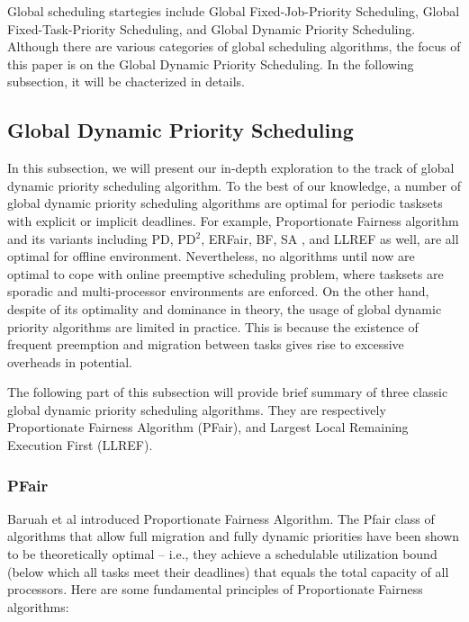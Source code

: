 \documentclass[preprint,12pt]{elsarticle}
\begin{document}
Global scheduling startegies include Global Fixed-Job-Priority Scheduling,
Global Fixed-Task-Priority Scheduling, and Global Dynamic Priority Scheduling. 
Although there are various categories of global scheduling algorithms, the
focus of this paper is on the Global Dynamic Priority Scheduling. In the
following subsection, it will be chacterized in details. 

\subsection{Global Dynamic Priority Scheduling}
In this subsection, we will present our in-depth exploration to the track of
global dynamic priority scheduling algorithm. To the best of our knowledge, a
number of global dynamic priority scheduling algorithms are optimal for
periodic tasksets with explicit or implicit deadlines.
For example, Proportionate Fairness algorithm and its variants including PD,
PD$^2$, ERFair, BF, SA \cite{khemka1997optimal}, and LLREF
\cite{cho2006optimal} as well, are all optimal for offline environment.
Nevertheless, no algorithms until now are optimal to cope with online
preemptive scheduling problem, where tasksets are sporadic and multi-processor
environments are enforced.
On the other hand, despite of its optimality and dominance in theory, the
usage of global dynamic priority algorithms are limited in practice. This is
because the existence of frequent preemption and migration between tasks gives
rise to excessive overheads in potential. 

The following part of this subsection will provide brief summary of three
classic global dynamic priority scheduling algorithms. They are respectively 
Proportionate Fairness Algorithm (PFair), and Largest Local Remaining Execution
First (LLREF). 

\subsubsection{PFair}
Baruah et al \cite{baruah1996proportionate} introduced Proportionate Fairness
Algorithm. 
The Pfair class of algorithms that allow full migration and fully dynamic
priorities have been shown to be theoretically optimal -- i.e., they achieve a
schedulable utilization bound (below which all tasks meet their deadlines)
that equals the total capacity of all processors. Here are some fundamental
principles of Proportionate Fairness algorithms: 
\end{document}
